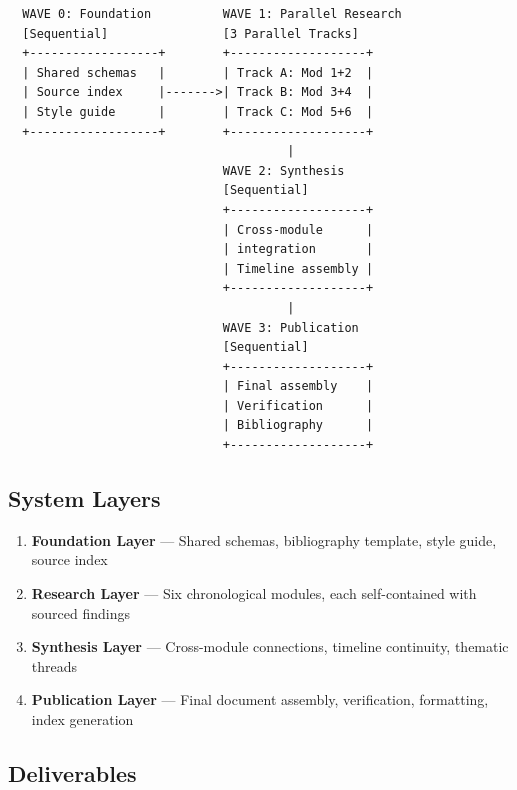 \documentclass[11pt,letterpaper]{article}
\begin{document}
\begin{asciibox}
\begin{verbatim}
  WAVE 0: Foundation          WAVE 1: Parallel Research
  [Sequential]                [3 Parallel Tracks]
  +------------------+        +-------------------+
  | Shared schemas   |        | Track A: Mod 1+2  |
  | Source index     |------->| Track B: Mod 3+4  |
  | Style guide      |        | Track C: Mod 5+6  |
  +------------------+        +-------------------+
                                       |
                              WAVE 2: Synthesis
                              [Sequential]
                              +-------------------+
                              | Cross-module      |
                              | integration       |
                              | Timeline assembly |
                              +-------------------+
                                       |
                              WAVE 3: Publication
                              [Sequential]
                              +-------------------+
                              | Final assembly    |
                              | Verification      |
                              | Bibliography      |
                              +-------------------+
\end{verbatim}
\end{asciibox}

\subsection{System Layers}

\begin{enumerate}[nosep]
  \item \textbf{Foundation Layer} --- Shared schemas, bibliography template, style guide, source index
  \item \textbf{Research Layer} --- Six chronological modules, each self-contained with sourced findings
  \item \textbf{Synthesis Layer} --- Cross-module connections, timeline continuity, thematic threads
  \item \textbf{Publication Layer} --- Final document assembly, verification, formatting, index generation
\end{enumerate}

\subsection{Deliverables}
\end{document}
